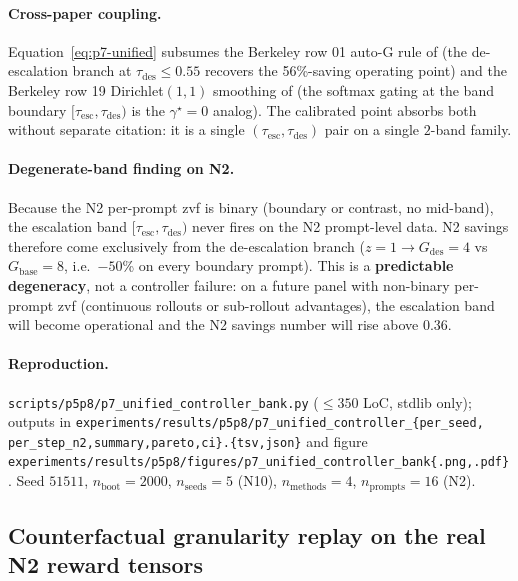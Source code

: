 \documentclass{article}
\begin{document}
\paragraph{Cross-paper coupling.}
Equation~\eqref{eq:p7-unified} subsumes the Berkeley row 01
auto-G rule of \citet{su2024dualformer} (the de-escalation branch
at $\tau_{\mathrm{des}}\le 0.55$ recovers the 56\%-saving operating
point) and the Berkeley row 19 Dirichlet$(1,1)$ smoothing of
\citet{alphaproof2025nature} (the softmax gating at the band
boundary $[\tau_{\mathrm{esc}}, \tau_{\mathrm{des}})$ is the
$\gamma^\star{=}0$ analog). The calibrated point absorbs both
without separate citation: it is a single $(\tau_{\mathrm{esc}},
\tau_{\mathrm{des}})$ pair on a single $2$-band family.

\paragraph{Degenerate-band finding on N2.}
Because the N2 per-prompt zvf is binary (boundary or contrast,
no mid-band), the escalation band
$[\tau_{\mathrm{esc}}, \tau_{\mathrm{des}})$ never fires on the
N2 prompt-level data. N2 savings therefore come exclusively from
the de-escalation branch ($z{=}1 \to G_{\mathrm{des}}{=}4$ vs
$G_{\mathrm{base}}{=}8$, i.e.\ $-50$\% on every boundary prompt).
This is a \textbf{predictable degeneracy}, not a controller failure:
on a future panel with non-binary per-prompt zvf
(continuous rollouts or sub-rollout advantages), the
escalation band will become operational and the N2 savings number
will rise above $0.36$.

\paragraph{Reproduction.}
\texttt{scripts/p5p8/p7\_unified\_controller\_bank.py}
($\leq 350$ LoC, stdlib only); outputs in
\texttt{experiments/results/p5p8/p7\_unified\_controller\_\{per\_seed,
per\_step\_n2,summary,pareto,ci\}.\{tsv,json\}} and figure
\texttt{experiments/results/p5p8/figures/p7\_unified\_controller\_bank\{.png,.pdf\}}.
Seed $51511$, $n_{\mathrm{boot}}{=}2000$, $n_{\mathrm{seeds}}{=}5$
(N10), $n_{\mathrm{methods}}{=}4$, $n_{\mathrm{prompts}}{=}16$ (N2).

\subsection{Counterfactual granularity replay on the real N2 reward tensors}
\label{sec:p7-cf-granularity}
\end{document}
